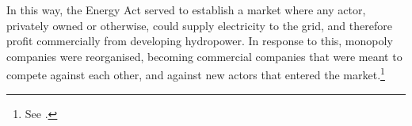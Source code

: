 In this way, the Energy Act served to establish a market where any actor, privately owned or otherwise, could supply electricity to the grid, and therefore profit commercially from developing hydropower. In response to this, monopoly companies were reorganised, becoming commercial companies that were meant to compete against each other, and against new actors that entered the market.\footnote{See \cite{claes11}.} %
